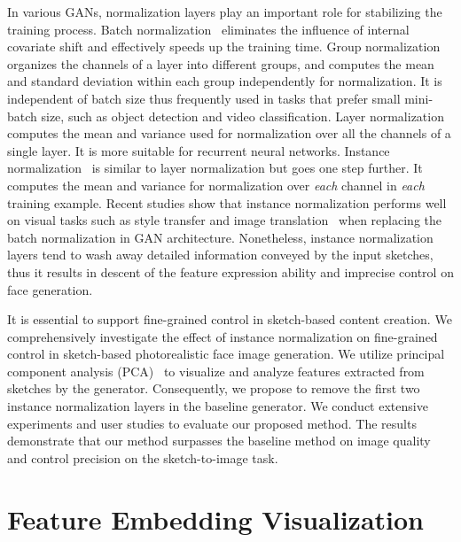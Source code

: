 \documentclass{article}
\begin{document}
In various GANs, normalization layers play an important role for stabilizing the training process. 
Batch normalization~\cite{bn} eliminates the influence of internal covariate shift and effectively speeds up the training time. 
Group normalization~\cite{gn} organizes the channels of a layer into different groups, and computes the mean and standard deviation within each group independently for normalization. It is independent of batch size thus frequently used in tasks that prefer small mini-batch size, such as object detection and video classification.
Layer normalization~\cite{ln} computes the mean and variance used for normalization over all the channels of a single layer. It is more suitable for recurrent neural networks. 
Instance normalization~\cite{instance_norm} is similar to layer normalization but goes one step further. It computes the mean and variance for normalization over \emph{each} channel in \emph{each} training example.
Recent studies show that instance normalization performs well on visual tasks such as style transfer and image translation~\cite{pix2pixhd,spade,cyclegan} when replacing the batch normalization in GAN architecture. 
Nonetheless, instance normalization layers tend to wash away detailed information conveyed by the input sketches, thus it results in descent of the feature expression ability and imprecise control on face generation. 
 
It is essential to support fine-grained control in sketch-based content creation. 
We comprehensively investigate the effect of instance normalization on fine-grained control in sketch-based photorealistic face image generation. 
We utilize principal component analysis (PCA)~\cite{pca} to visualize and analyze features extracted from sketches by the generator. 
Consequently, we propose to remove the first two instance normalization layers in the baseline generator.
We conduct extensive experiments and user studies to evaluate our proposed method. The results demonstrate that our method surpasses the baseline method on image quality and control precision on the sketch-to-image task.


\section{Feature Embedding Visualization}
\label{sec:visualize}
\end{document}

